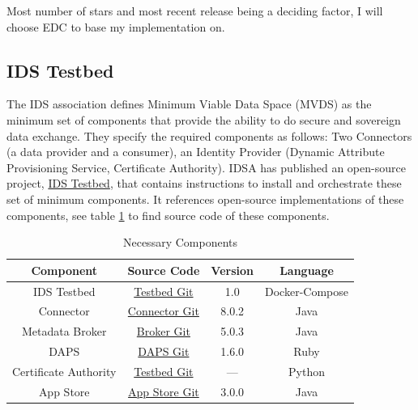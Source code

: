 \documentclass{article}
\begin{document}
Most number of stars and most recent release being a deciding factor, I will choose EDC to base my implementation on.

\subsection*{IDS Testbed}
The IDS association defines Minimum Viable Data Space (MVDS) as the minimum set of components that provide the ability to do secure and sovereign data exchange. They specify the required components as follows: Two Connectors (a data provider and a consumer), an Identity Provider (Dynamic Attribute Provisioning Service, Certificate Authority). IDSA has published an open-source project, \href{https://github.com/International-Data-Spaces-Association/IDS-testbed}{IDS Testbed}, that contains instructions to install and orchestrate these set of minimum components. It references open-source implementations of these components, see table \ref{tab:components} to find source code of these components.

\begin{table}[h]
    \label{tab:components}
    \centering
    \begin{tabular}{|c|c|c|c|}
    \hline
    \textbf{Component} & \textbf{Source Code} & \textbf{Version} & \textbf{Language} \\
    \hline
    IDS Testbed & \href{https://github.com/International-Data-Spaces-Association/IDS-testbed}{Testbed Git} & 1.0 & Docker-Compose \\
    \hline
    Connector & \href{https://github.com/International-Data-Spaces-Association/DataspaceConnector/tree/v8.0.2}{Connector Git} & 8.0.2 & Java \\
    \hline
    Metadata Broker & \href{https://github.com/International-Data-Spaces-Association/metadata-broker-open-core}{Broker Git} & 5.0.3 & Java \\
    \hline
    DAPS & \href{https://github.com/International-Data-Spaces-Association/omejdn-daps}{DAPS Git} & 1.6.0 & Ruby \\
    \hline
    Certificate Authority & \href{https://github.com/International-Data-Spaces-Association/IDS-testbed/tree/master/CertificateAuthority}{Testbed Git} & --- & Python \\
    \hline
    App Store & \href{https://github.com/International-Data-Spaces-Association/IDS-AppStore}{App Store Git} & 3.0.0 & Java \\
    \hline
    \end{tabular}
    \caption{Necessary Components}
\end{table}
\end{document}
